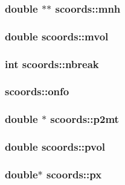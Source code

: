 \subsubsection{\setlength{\rightskip}{0pt plus 5cm}double $\ast$$\ast$ {\bf scoords::mnh}}\label{structscoords_2d141af9437653e64efe946823876cba}


\subsubsection{\setlength{\rightskip}{0pt plus 5cm}double {\bf scoords::mvol}}\label{structscoords_b9fcc5fd8af2147635475a5117a73230}


\subsubsection{\setlength{\rightskip}{0pt plus 5cm}int {\bf scoords::nbreak}}\label{structscoords_43db474e1b4da9d8c3c19d08b1adcdff}


\subsubsection{ {\bf scoords::onfo}}\label{structscoords_a8aa6a908e3928086490e1127feabd45}


\subsubsection{\setlength{\rightskip}{0pt plus 5cm}double $\ast$ {\bf scoords::p2mt}}\label{structscoords_fdf48f77241c233467a43d993ca00715}


\subsubsection{\setlength{\rightskip}{0pt plus 5cm}double {\bf scoords::pvol}}\label{structscoords_097d81de5aa95c133d2fce40d5eb5784}


\subsubsection{\setlength{\rightskip}{0pt plus 5cm}double$\ast$ {\bf scoords::px}}\label{structscoords_e6ab41da9ee564e0b276d8a2b9c3ec60}


